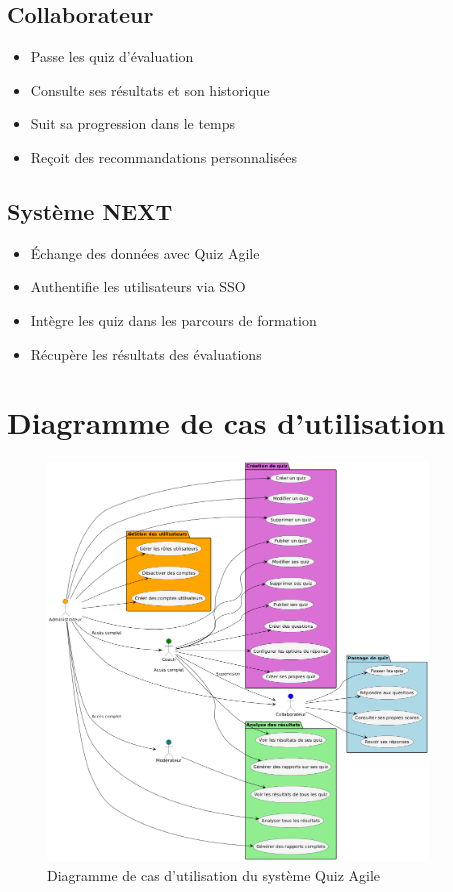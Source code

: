 \documentclass[12pt,a4paper]{report}
\begin{document}
\subsection{Collaborateur}

\begin{itemize}
\item Passe les quiz d'évaluation
\item Consulte ses résultats et son historique
\item Suit sa progression dans le temps
\item Reçoit des recommandations personnalisées
\end{itemize}

\subsection{Système NEXT}

\begin{itemize}
\item Échange des données avec Quiz Agile
\item Authentifie les utilisateurs via SSO
\item Intègre les quiz dans les parcours de formation
\item Récupère les résultats des évaluations
\end{itemize}

\section{Diagramme de cas d'utilisation}

\begin{figure}[htbp]
    \centering
    \includegraphics[width=0.9\textwidth]{latex_media/media/image14.png}
    \caption{Diagramme de cas d'utilisation du système Quiz Agile}
    \label{fig:cas-utilisation}
\end{figure}
\end{document}

